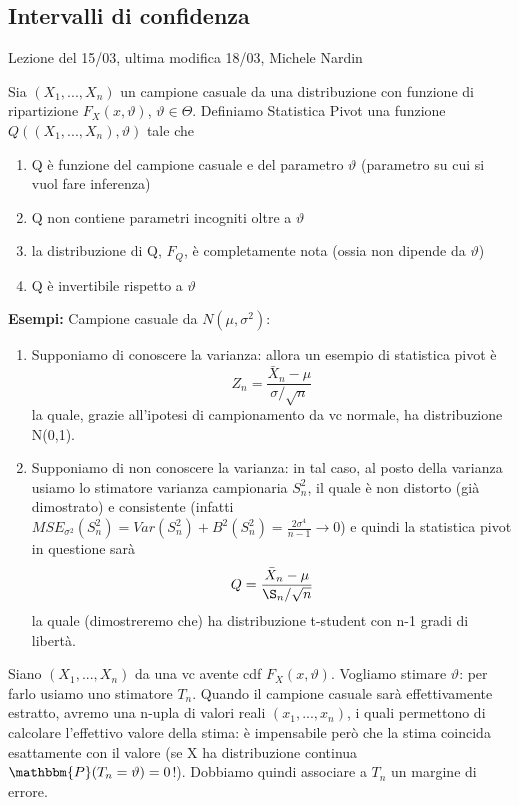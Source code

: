 
\subsection{Intervalli di confidenza}
Lezione del 15/03, ultima modifica 18/03, Michele Nardin

\begin{definizione}
Sia $(X_1,...,X_n)$ un campione casuale da una distribuzione con funzione di ripartizione $F_X (x,\vartheta)$, $\vartheta \in \Theta$. 
Definiamo Statistica Pivot una funzione $Q((X_1,...,X_n),\vartheta)$ tale che
\begin{enumerate}
\item Q è funzione del campione casuale e del parametro $\vartheta$ (parametro su cui si vuol fare inferenza)
\item Q non contiene parametri incogniti oltre a $\vartheta$
\item la distribuzione di Q, $F_Q$, è completamente nota (ossia non dipende da $\vartheta$)
\item Q è invertibile rispetto a $\vartheta$
\end{enumerate}
\end{definizione}

\textbf{Esempi:}
Campione casuale da $N(\mu,\sigma^2)$:
\begin{enumerate}
\item Supponiamo di conoscere la varianza: allora un esempio di statistica pivot è $$Z_n=\frac{\bar{X}_n - \mu}{\sigma / \sqrt{n}} $$ la quale, grazie all'ipotesi di campionamento da vc normale, ha distribuzione N(0,1).
\item Supponiamo di non conoscere la varianza: in tal caso, al posto della varianza usiamo lo stimatore varianza campionaria $S_n^2$, il quale è non distorto (già dimostrato) e consistente (infatti $MSE_{\sigma^2}(S_n^2)=Var(S_n^2) + B^2(S_n^2)=\frac{2\sigma^4}{n-1} \rightarrow 0$) e quindi la statistica pivot in questione sarà $$Q=\frac{\bar{X}_n - \mu}{\S_n / \sqrt{n}}$$ la quale (dimostreremo che) ha distribuzione t-student con n-1 gradi di libertà.
\end{enumerate}

Siano $(X_1,...,X_n)$ da una vc avente cdf $F_X(x,\vartheta)$. Vogliamo stimare $\vartheta$: per farlo usiamo uno stimatore $T_n$.
Quando il campione casuale sarà effettivamente estratto, avremo una n-upla di valori reali $(x_1,...,x_n)$, i quali permettono di calcolare l'effettivo valore della stima: è impensabile però che la stima coincida esattamente con il valore (se X ha distribuzione continua $\mathbbm{P}(T_n=\vartheta)=0$!). Dobbiamo quindi associare a $T_n$ un margine di errore.

